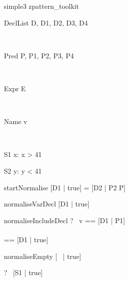 \begin{zsection}
\SECTION simple3 \parents zpattern\_toolkit
\end{zsection}

\begin{zedjoker}{DeclList} D, D1, D2, D3, D4\end{zedjoker} \\
\begin{zedjoker}{Pred} P, P1, P2, P3, P4\end{zedjoker} \\
\begin{zedjoker}{Expr} E\end{zedjoker} \\
\begin{zedjoker}{Name} v\end{zedjoker} \\

\begin{schema}{S1}
  x:\nat
\where
  x > 41
\end{schema}

\begin{schema}{S2}
  y:\nat
\where
  y < 41
\end{schema}

\begin{zedrule}{startNormalise}
   [D1 | true] \unfoldsTo [D2 | P2]
\derives
   [D1 | P] = [D2 | P2 \land P]
\end{zedrule}

\begin{zedrule}{normaliseVarDecl}
   [D1 | true] \unfoldsTo [D2 | P2]
\derives
   [v:E; D1 | true] \unfoldsTo [v:E; D2 | P2]
\end{zedrule}

\begin{zedrule}{normaliseIncludeDecl}
   \proviso ?~ v == [D1 | P1] \\
   [D | true] \unfoldsTo [D2 | P2] \\
   \proviso [D3 | true] == [D1 | true] \schemamerge [D2 | true]
\derives
   [v; D | true] \unfoldsTo [D3 | P1 \land P2]
\end{zedrule}

\begin{zedrule}{normaliseEmpty}
   [~ | true] \unfoldsTo [~ | true]
\end{zedrule}

\begin{zed}
  \vdash?~ [S1 | true] 
\end{zed}

